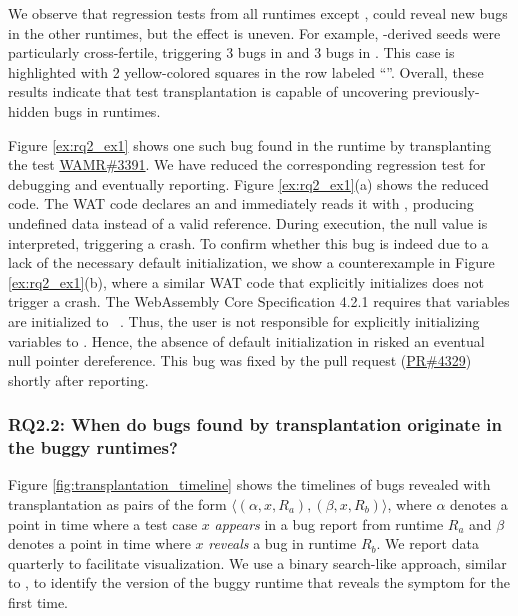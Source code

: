 \documentclass[lettersize,journal]{IEEEtran}
\begin{document}
We observe that regression tests from all runtimes except \wasmer{}, could reveal new bugs in the other runtimes, but the effect is uneven. For example, \wamr{}-derived seeds were particularly cross-fertile, triggering 3 bugs in \wasmer{} and 3 bugs in \wasmedge{}. This case is highlighted with 2 yellow-colored squares in the row labeled ``\wamr{}''. 
Overall, these results indicate that test transplantation is capable of uncovering previously-hidden bugs in runtimes.

Figure \ref{ex:rq2_ex1} shows one such bug found in the \wasmedge{} runtime by transplanting the test \href{https://github.com/bytecodealliance/wasm-micro-runtime/issues/3391}{WAMR\#3391}. We have reduced the corresponding regression test for debugging and eventually reporting. Figure \ref{ex:rq2_ex1}(a) shows the reduced code. The WAT code declares an  and immediately reads it with , producing undefined data instead of a valid reference. During execution, the null value is interpreted, triggering a crash. To confirm whether this bug is indeed due to a lack of the necessary default initialization, we show a counterexample in Figure \ref{ex:rq2_ex1}(b), where a similar WAT code that explicitly initializes  does not trigger a crash. The WebAssembly Core Specification 4.2.1 requires that  variables are initialized to ~\cite{spec_default_values}. Thus, the user is not responsible for explicitly initializing  variables to . Hence, the absence of default initialization in \wasmedge{} risked an eventual null pointer dereference. This bug was fixed by the pull request (\href{https://github.com/WasmEdge/WasmEdge/pull/4329}{PR\#4329}) shortly after reporting.

\subsubsection{\label{sec:rqtwo-parttwo}RQ2.2: When do bugs found by transplantation originate in the buggy runtimes?}
Figure \ref{fig:transplantation_timeline} shows the timelines of bugs revealed with transplantation as pairs of the form $\langle{}(\alpha, x, R_a), (\beta, x, R_b)\rangle{}$, where $\alpha$ denotes a point in time where a test case $x$ \emph{appears} in a bug report from runtime $R_a$ and $\beta$ denotes a point in time where $x$ \emph{reveals} a bug in runtime $R_b$. We report data quarterly to facilitate visualization. We use a binary search-like approach, similar to , to identify the version of the buggy runtime that reveals the symptom for the first time.
\end{document}
